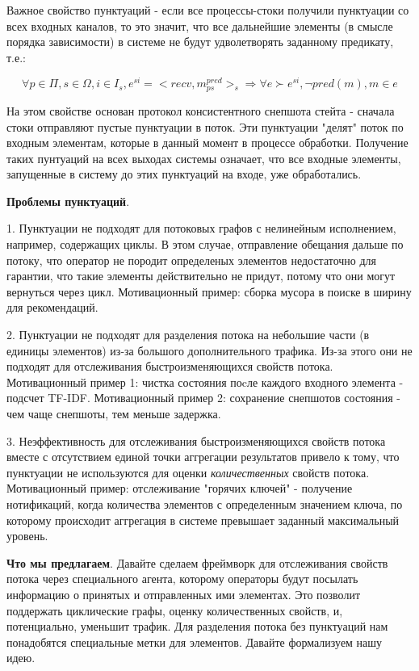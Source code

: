 \documentclass[12pt]{article}
\begin{document}
Важное свойство пунктуаций - если все процессы-стоки получили пунктуации со всех входных каналов, то это значит, что все дальнейшие элементы (в смысле порядка зависимости) в системе не будут удволетворять заданному предикату, т.е.:

$$\forall p \in \Pi, s \in \Omega, i \in I_s, e^{si} = <recv, m^{pred}_{ps}>_s \Rightarrow \forall e \succ e^{si}, \neg pred(m), m \in e$$

На этом свойстве основан протокол консистентного снепшота стейта - сначала стоки отправляют пустые пунктуации в поток. Эти пунктуации "делят" поток по входным элементам, которые в данный момент в процессе обработки. Получение таких пунтуаций на всех выходах системы означает, что все входные элементы, запущенные в систему до этих пунктуаций на входе, уже обработались.

\textbf{Проблемы пунктуаций}. 

1. Пунктуации не подходят для потоковых графов с нелинейным исполнением, например, содержащих циклы. В этом случае, отправление обещания дальше по потоку, что оператор не породит определеных элементов недостаточно для гарантии, что такие элементы действительно не придут, потому что они могут вернуться через цикл. Мотивационный пример: сборка мусора в поиске в ширину для рекомендаций.

2. Пунктуации не подходят для разделения потока на небольшие части (в единицы элементов) из-за большого дополнительного трафика. Из-за этого они не подходят для отслеживания быстроизменяющихся свойств потока. Мотивационный пример 1: чистка состояния поcле каждого входного элемента - подсчет TF-IDF. Мотивационный пример 2: сохранение снепшотов состояния - чем чаще снепшоты, тем меньше задержка.

3. Неэффективность для отслеживания быстроизменяющихся свойств потока вместе с отсутствием единой точки аггрегации результатов привело к тому, что пунктуации не используются для оценки \textit{количественных} свойств потока. Мотивационный пример: отслеживание "горячих ключей" - получение нотификаций, когда количества элементов с определенным значением ключа, по которому происходит аггрегация в системе превышает заданный максимальный уровень.

\textbf{Что мы предлагаем}. Давайте сделаем фреймворк для отслеживания свойств потока через специального агента, которому операторы будут посылать информацию о принятых и отправленных ими элементах. Это позволит поддержать циклические графы, оценку количественных свойств, и, потенциально, уменьшит трафик. Для разделения потока без пунктуаций нам понадобятся специальные метки для элементов. Давайте формализуем нашу идею.
\end{document}
